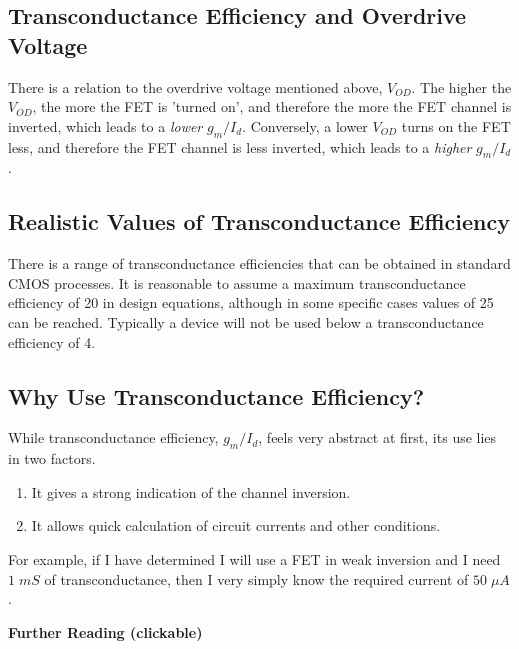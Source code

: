 \documentclass[11pt]{article}
\begin{document}
\subsection{Transconductance Efficiency and Overdrive Voltage}

There is a relation to the overdrive voltage mentioned above, $V_{OD}$. The higher the $V_{OD}$, the more the FET is 'turned on', and therefore the more the FET channel is inverted, which leads to a \textit{lower} $g_m / I_d$. Conversely, a lower $V_{OD}$ turns on the FET less, and therefore the FET channel is less inverted, which leads to a \textit{higher} $g_m / I_d$.

\subsection{Realistic Values of Transconductance Efficiency}

There is a range of transconductance efficiencies that can be obtained in standard CMOS processes. It is reasonable to assume a maximum transconductance efficiency of 20 in design equations, although in some specific cases values of 25 can be reached. Typically a device will not be used below a transconductance efficiency of 4.

\subsection{Why Use Transconductance Efficiency?}

While transconductance efficiency, $g_m/I_d$, feels very abstract at first, its use lies in two factors.

\begin{enumerate}
  \item It gives a strong indication of the channel inversion.
  \item It allows quick calculation of circuit currents and other conditions.
\end{enumerate}

For example, if I have determined I will use a FET in weak inversion and I need $1 \; mS$ of transconductance, then I very simply know the required current of $50 \; \mu A$.


\textbf{Further Reading (clickable)}
\end{document}
